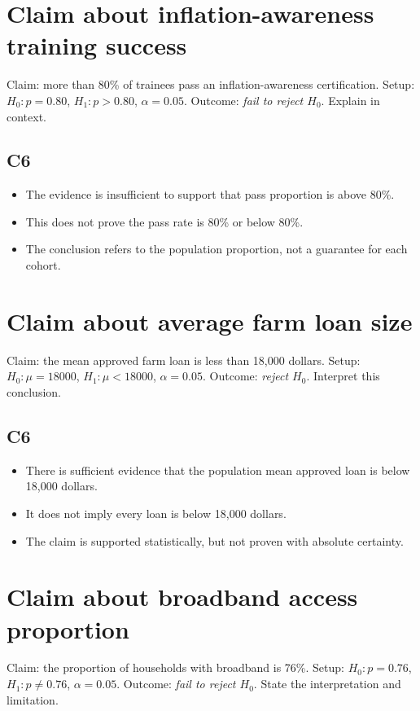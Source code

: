 \begin{ExamProblems}
\item
\section{Claim about inflation-awareness training success}
Claim: more than 80\% of trainees pass an inflation-awareness certification. Setup: \(H_0\colon p=0.80\), \(H_1\colon p>0.80\), \(\alpha=0.05\). Outcome: \textit{fail to reject \(H_0\)}. Explain in context.

\subsection*{C6}
\begin{itemize}
    \item The evidence is insufficient to support that pass proportion is above 80\%.
    \item This does not prove the pass rate is 80\% or below 80\%.
    \item The conclusion refers to the population proportion, not a guarantee for each cohort.
\end{itemize}

\item
\section{Claim about average farm loan size}
Claim: the mean approved farm loan is less than 18{,}000 dollars. Setup: \(H_0\colon \mu=18000\), \(H_1\colon \mu<18000\), \(\alpha=0.05\). Outcome: \textit{reject \(H_0\)}. Interpret this conclusion.

\subsection*{C6}
\begin{itemize}
    \item There is sufficient evidence that the population mean approved loan is below 18{,}000 dollars.
    \item It does not imply every loan is below 18{,}000 dollars.
    \item The claim is supported statistically, but not proven with absolute certainty.
\end{itemize}

\item
\section{Claim about broadband access proportion}
Claim: the proportion of households with broadband is 76\%. Setup: \(H_0\colon p=0.76\), \(H_1\colon p\ne 0.76\), \(\alpha=0.05\). Outcome: \textit{fail to reject \(H_0\)}. State the interpretation and limitation.


\end{ExamProblems}
